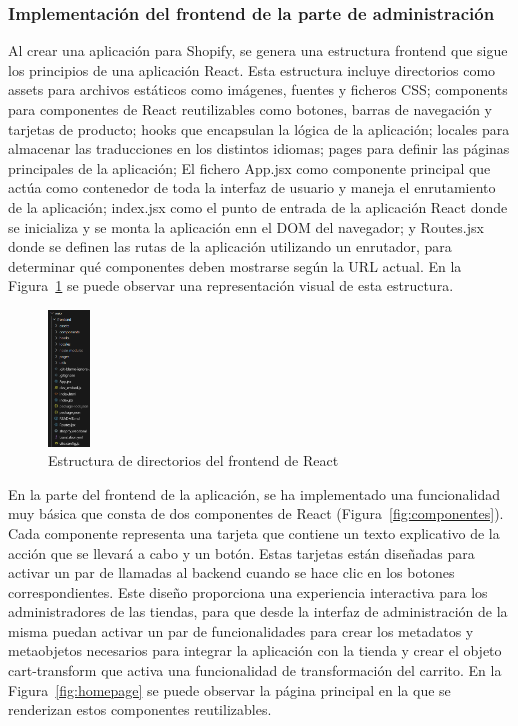 \documentclass[12pt]{article}
\begin{document}
\clearpage
\subsubsection{Implementación del frontend de la parte de administración}

Al crear una aplicación para Shopify, se genera una estructura frontend que sigue los principios de una aplicación React. Esta estructura incluye directorios como assets para 
archivos estáticos como imágenes, fuentes y ficheros CSS; components para componentes de React reutilizables como botones, barras de navegación y tarjetas de producto; 
hooks que encapsulan la lógica de la aplicación; locales para almacenar las traducciones en los distintos idiomas; pages para definir las páginas principales de la aplicación; El fichero App.jsx como
componente principal que actúa como contenedor de toda la interfaz de usuario y maneja el enrutamiento de la aplicación; index.jsx como el punto de entrada de la aplicación React donde
se inicializa y se monta la aplicación enn el DOM del navegador; y Routes.jsx donde se definen las rutas de la aplicación utilizando un enrutador, para determinar qué componentes
deben mostrarse según la URL actual. En la Figura~\ref{fig:estructuraFront} se puede observar una representación visual de esta estructura.

\begin{figure}[ht]
    \centering
    \includegraphics[width=0.1\textwidth]{imagenes-admin/EstructuraDirectoriosReact.png}
    \caption{\label{fig:estructuraFront} Estructura de directorios del frontend de React}
    \vspace{\fill}
\end{figure}

En la parte del frontend de la aplicación, se ha implementado una funcionalidad muy básica que consta de dos componentes de React (Figura~\ref{fig:componentes}). Cada componente representa una tarjeta que 
contiene un texto explicativo de la acción que se llevará a cabo y un botón. Estas tarjetas están diseñadas para activar un par de llamadas al backend cuando se hace clic en los 
botones correspondientes. Este diseño proporciona una experiencia interactiva para los administradores de las tiendas, para que desde la interfaz de administración de la misma
puedan activar un par de funcionalidades para crear los metadatos y metaobjetos necesarios para integrar la aplicación con la tienda y crear el objeto cart-transform que activa una funcionalidad
de transformación del carrito. En la Figura~\ref{fig:homepage} se puede observar la página principal en la que se renderizan estos componentes reutilizables.
\end{document}
